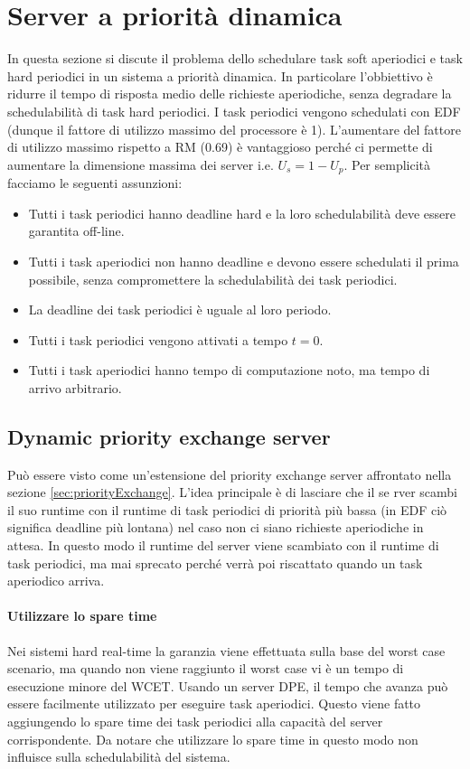 \documentclass[12pt,openany,onesided]{book}
\begin{document}
\chapter{Server a priorità dinamica}
In questa sezione si discute il problema dello schedulare task soft aperiodici e task hard periodici in un sistema a priorità dinamica.
In particolare l'obbiettivo è ridurre il tempo di risposta medio delle richieste aperiodiche, senza degradare la schedulabilità di task hard periodici.
I task periodici vengono schedulati con EDF (dunque il fattore di utilizzo massimo del processore è 1).
L'aumentare del fattore di utilizzo massimo rispetto a RM (0.69) è vantaggioso perché ci permette di aumentare la dimensione massima dei server i.e. $U_s = 1- U_p$.
Per semplicità facciamo le seguenti assunzioni:
\begin{itemize}
\item Tutti i task periodici hanno deadline hard e la loro schedulabilità deve essere garantita off-line.
\item Tutti i task aperiodici non hanno deadline e devono essere schedulati il prima possibile, senza compromettere la schedulabilità dei task periodici.
\item La deadline dei task periodici è uguale al loro periodo.
\item Tutti i task periodici vengono attivati a tempo $t=0$.
\item Tutti i task aperiodici hanno tempo di computazione noto, ma tempo di arrivo arbitrario.
\end{itemize}
\section{Dynamic priority exchange server}
\label{sec:dynamicPriorityExchange}
Può essere visto come un'estensione del priority exchange server affrontato nella sezione \ref{sec:priorityExchange}.
L'idea principale è di lasciare che il se rver scambi il suo runtime con il runtime di task periodici di priorità più bassa (in EDF ciò significa deadline più lontana) nel caso non ci siano richieste aperiodiche in attesa.
In questo modo il runtime del server viene scambiato con il runtime di task periodici, ma mai sprecato perché verrà poi riscattato quando un task aperiodico arriva.
\subsubsection{Utilizzare lo spare time}
Nei sistemi hard real-time la garanzia viene effettuata sulla base del worst case scenario, ma quando non viene raggiunto il worst case vi è un tempo di esecuzione minore del WCET.
Usando un server DPE, il tempo che avanza può essere facilmente utilizzato per eseguire task aperiodici.
Questo viene fatto aggiungendo lo spare time dei task periodici alla capacità del server corrispondente.
Da notare che utilizzare lo spare time in questo modo non influisce sulla schedulabilità del sistema.
\end{document}
